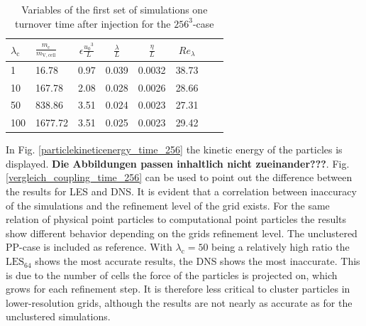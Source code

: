 \documentclass[11pt,a4paper,openany,oneside,parskip=half*]{article}
\begin{document}
\begin{table}[h]
	\begin{center}
	\begin{tabular}{l l | c c c c c c }
	$\lambda_\mathrm{c}$& $\frac{m_\mathrm{c}}{m_\mathrm{V,cell}}$ & $\epsilon \frac{{u_0}^3}{L}$ & $\frac{\lambda}{L}$ & $\frac{\eta}{L} $ & $Re_\lambda$ \\
	\hline
	\hline
	1 &16.78 & 0.97& 0.039 & 0.0032 & 38.73 &\\
	10 &167.78 & 2.08 & 0.028 & 0.0026 & 28.66 &\\
	50 &838.86 & 3.51 & 0.024 & 0.0023 & 27.31 &\\
	100 &1677.72 & 3.51 & 0.025 & 0.0023 & 29.42 &\\
	\hline
	\end{tabular}
	\captionsetup{width=0.9\linewidth}
	\caption{Variables of the first set of simulations one turnover time after injection for the $256^3$-case}
	\label{table_values}
	\end{center}
	\end{table}
In Fig. \ref{particlekineticenergy_time_256} the kinetic energy of the particles is displayed. \textbf{Die Abbildungen passen inhaltlich nicht zueinander???}. Fig. \ref{vergleich_coupling_time_256} can be used to point out the difference between the results for LES and DNS. It is evident that a correlation between inaccuracy of the simulations and the refinement level of the grid exists. For the same relation of physical point particles to computational point particles the results show different behavior depending on the grids refinement level. The unclustered PP-case is included as reference. With $\lambda_\mathrm{c}=50$ being a relatively high ratio the $\mathrm{LES}_\mathrm{64}$ shows the most accurate results, the DNS shows the most inaccurate. This is due to the number of cells the force of the particles is projected on, which grows for each refinement step. It is therefore less critical to cluster particles in lower-resolution grids, although the results are not nearly as accurate as for the unclustered simulations. 
\newline
\end{document}
